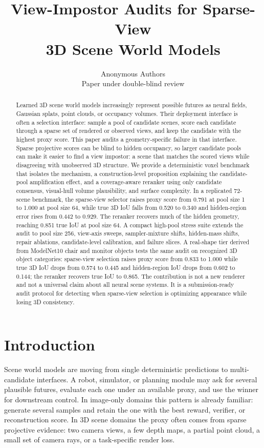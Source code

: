 \documentclass{article}
\title{View-Impostor Audits for Sparse-View\\3D Scene World Models}
\author{Anonymous Authors\\Paper under double-blind review}
\begin{document}
\maketitle

\begin{abstract}
Learned 3D scene world models increasingly represent possible futures as
neural fields, Gaussian splats, point clouds, or occupancy volumes. Their
deployment interface is often a selection interface: sample a pool of candidate
scenes, score each candidate through a sparse set of rendered or observed
views, and keep the candidate with the highest proxy score. This paper audits a
geometry-specific failure in that interface. Sparse projective scores can be
blind to hidden occupancy, so larger candidate pools can make it easier to find
a view impostor: a scene that matches the scored views while disagreeing with
unobserved 3D structure. We provide a deterministic voxel benchmark that
isolates the mechanism, a construction-level proposition explaining the
candidate-pool amplification effect, and a coverage-aware reranker using only
candidate consensus, visual-hull volume plausibility, and surface complexity.
In a replicated 72-scene benchmark, the sparse-view selector raises proxy score
from 0.791 at pool size 1 to 1.000 at pool size 64, while true 3D IoU falls
from 0.520 to 0.340 and hidden-region error rises from 0.442 to 0.929. The
reranker recovers much of the hidden geometry, reaching 0.851 true IoU at pool
size 64. A compact high-pool stress suite extends the audit to pool size 256,
view-axis sweeps, sampler-mixture shifts, hidden-mass shifts, repair ablations,
candidate-level calibration, and failure slices. A real-shape tier derived from
ModelNet10 chair and monitor objects tests the same audit on recognized 3D
object categories: sparse-view selection raises proxy score from 0.833 to
1.000 while true 3D IoU drops from 0.574 to 0.445 and hidden-region IoU drops
from 0.602 to 0.144; the reranker recovers true IoU to 0.865. The contribution
is not a new
renderer and not a universal claim about all neural scene systems. It is a
submission-ready audit protocol for detecting when sparse-view selection is
optimizing appearance while losing 3D consistency.
\end{abstract}

\section{Introduction}

Scene world models are moving from single deterministic predictions to
multi-candidate interfaces. A robot, simulator, or planning module may ask for
several plausible futures, evaluate each one under an available proxy, and use
the winner for downstream control. In image-only domains this pattern is
already familiar: generate several samples and retain the one with the best
reward, verifier, or reconstruction score. In 3D scene domains the proxy often
comes from sparse projective evidence: two camera views, a few depth maps, a
partial point cloud, a small set of camera rays, or a task-specific render loss.
\end{document}

